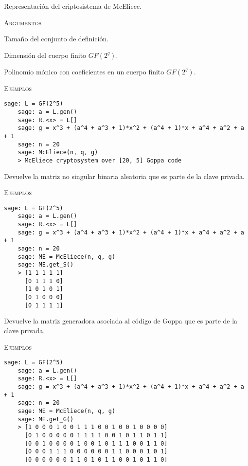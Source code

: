 \begin{description}[leftmargin=1em, font=\normalfont\ttfamily, style=nextline]
  \item[class McEliece(self, n, q, g)]

  Representación del criptosistema de McEliece.

  \textsc{Argumentos}
  \begin{description}[font=\normalfont\ttfamily]
  \item[n] Tamaño del conjunto de definición.
  \item[q] Dimensión del cuerpo finito $GF(2^q)$.
  \item[g] Polinomio mónico con coeficientes en un cuerpo finito $GF(2^q)$.
  \end{description}

  \textsc{Ejemplos}
  \begin{lstlisting}[gobble=4]
    sage: L = GF(2^5)
    sage: a = L.gen()
    sage: R.<x> = L[]
    sage: g = x^3 + (a^4 + a^3 + 1)*x^2 + (a^4 + 1)*x + a^4 + a^2 + a + 1
    sage: n = 20
    sage: McEliece(n, q, g)
    > McEliece cryptosystem over [20, 5] Goppa code
  \end{lstlisting}

  \begin{description}[font=\ttfamily, style=nextline]
  \item[get\_S(self)] Devuelve la matriz no singular binaria aleatoria que es parte de la clave privada.

  \textsc{Ejemplos}
  \begin{lstlisting}[gobble=4]
    sage: L = GF(2^5)
    sage: a = L.gen()
    sage: R.<x> = L[]
    sage: g = x^3 + (a^4 + a^3 + 1)*x^2 + (a^4 + 1)*x + a^4 + a^2 + a + 1
    sage: n = 20
    sage: ME = McEliece(n, q, g)
    sage: ME.get_S()
    > [1 1 1 1 1]
      [0 1 1 1 0]
      [1 0 1 0 1]
      [0 1 0 0 0]
      [0 1 1 1 1]
  \end{lstlisting}

  \item[get\_G(self)] Devuelve la matriz generadora asociada al código de Goppa que es parte de la clave privada.

  \textsc{Ejemplos}
  \begin{lstlisting}[gobble=4]
    sage: L = GF(2^5)
    sage: a = L.gen()
    sage: R.<x> = L[]
    sage: g = x^3 + (a^4 + a^3 + 1)*x^2 + (a^4 + 1)*x + a^4 + a^2 + a + 1
    sage: n = 20
    sage: ME = McEliece(n, q, g)
    sage: ME.get_G()
    > [1 0 0 0 1 0 0 1 1 1 0 0 1 0 0 1 0 0 0 0]
      [0 1 0 0 0 0 0 1 1 1 1 0 0 1 0 1 1 0 1 1]
      [0 0 1 0 0 0 0 1 0 0 1 0 1 1 1 0 0 1 1 0]
      [0 0 0 1 1 1 0 0 0 0 0 0 1 1 0 0 0 1 0 1]
      [0 0 0 0 0 0 1 1 0 1 0 1 1 0 0 1 0 1 1 0]
  \end{lstlisting}


\end{description}
\end{description}

